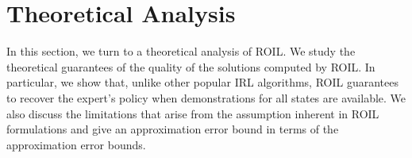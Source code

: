 


\section{Theoretical Analysis}
\label{sec:theoretical-analysis}

In this section, we turn to a theoretical analysis of ROIL. We study the theoretical guarantees of the quality of the solutions computed by ROIL. In particular, we show that, unlike other popular IRL algorithms, ROIL guarantees to recover the expert's policy when demonstrations for all states are available. We also discuss the limitations that arise from the assumption inherent in ROIL formulations and give an approximation error bound in terms of the approximation error bounds.

